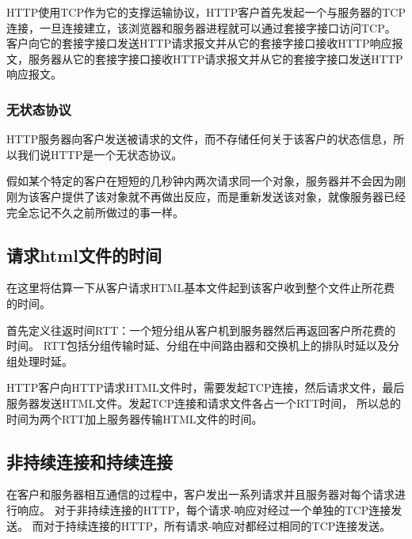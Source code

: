 \documentclass[a4paper,left=2.5cm,right=2.5cm,11pt]{article}
\begin{document}
	HTTP使用TCP作为它的支撑运输协议，HTTP客户首先发起一个与服务器的TCP连接，一旦连接建立，该浏览器和服务器进程就可以通过套接字接口访问TCP。
	客户向它的套接字接口发送HTTP请求报文并从它的套接字接口接收HTTP响应报文，服务器从它的套接字接口接收HTTP请求报文并从它的套接字接口发送HTTP响应报文。

\subsubsection{无状态协议}
	HTTP服务器向客户发送被请求的文件，而不存储任何关于该客户的状态信息，所以我们说HTTP是一个无状态协议。\par

	假如某个特定的客户在短短的几秒钟内两次请求同一个对象，服务器并不会因为刚刚为该客户提供了该对象就不再做出反应，而是重新发送该对象，就像服务器已经完全忘记不久之前所做过的事一样。

\subsection{请求html文件的时间}
	在这里将估算一下从客户请求HTML基本文件起到该客户收到整个文件止所花费的时间。\par

	首先定义往返时间RTT：一个短分组从客户机到服务器然后再返回客户所花费的时间。
	RTT包括分组传输时延、分组在中间路由器和交换机上的排队时延以及分组处理时延。\par

	HTTP客户向HTTP请求HTML文件时，需要发起TCP连接，然后请求文件，最后服务器发送HTML文件。发起TCP连接和请求文件各占一个RTT时间，
	所以总的时间为两个RTT加上服务器传输HTML文件的时间。

\subsection{非持续连接和持续连接}
	在客户和服务器相互通信的过程中，客户发出一系列请求并且服务器对每个请求进行响应。
	对于非持续连接的HTTP，每个请求-响应对经过一个单独的TCP连接发送。
	而对于持续连接的HTTP，所有请求-响应对都经过相同的TCP连接发送。
\end{document}

